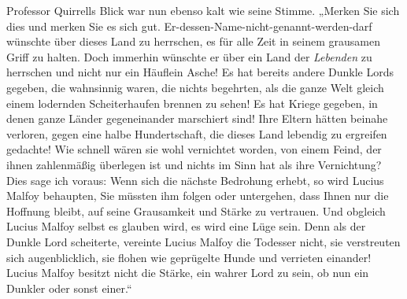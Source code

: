 Professor Quirrells Blick war nun ebenso kalt wie seine Stimme. „Merken Sie sich dies und merken Sie es sich gut. Er-dessen-Name-nicht-genannt-werden-darf wünschte über dieses Land zu herrschen, es für alle Zeit in seinem grausamen Griff zu halten. Doch immerhin wünschte er über ein Land der \emph{Lebenden} zu herrschen und nicht nur ein Häuflein Asche! Es hat bereits andere Dunkle Lords gegeben, die wahnsinnig waren, die nichts begehrten, als die ganze Welt gleich einem lodernden Scheiterhaufen brennen zu sehen! Es hat Kriege gegeben, in denen ganze Länder gegeneinander marschiert sind! Ihre Eltern hätten beinahe verloren, gegen eine halbe Hundertschaft, die dieses Land lebendig zu ergreifen gedachte! Wie schnell wären sie wohl vernichtet worden, von einem Feind, der ihnen zahlenmäßig überlegen ist und nichts im Sinn hat als ihre Vernichtung? Dies sage ich voraus: Wenn sich die nächste Bedrohung erhebt, so wird Lucius Malfoy behaupten, Sie müssten ihm folgen oder untergehen, dass Ihnen nur die Hoffnung bleibt, auf seine Grausamkeit und Stärke zu vertrauen. Und obgleich Lucius Malfoy selbst es glauben wird, es wird eine Lüge sein. Denn als der Dunkle Lord scheiterte, vereinte Lucius Malfoy die Todesser nicht, sie verstreuten sich augenblicklich, sie flohen wie geprügelte Hunde und verrieten einander! Lucius Malfoy besitzt nicht die Stärke, ein wahrer Lord zu sein, ob nun ein Dunkler oder sonst einer.“

